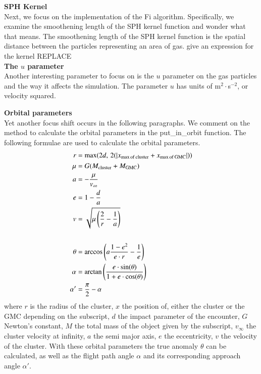 \documentclass{aa}
\begin{document}
\noindent \textbf{SPH Kernel} \\
Next, we focus on the implementation of the Fi algorithm. Specifically, we examine the smoothening length of the SPH kernel function and wonder what that means. The smoothening length of the SPH kernel function is the spatial distance between the particles representing an area of gas. \cite{1985A&A...149..135M} give an expression for the kernel REPLACE \\

\noindent \textbf{The $u$ parameter} \\
Another interesting parameter to focus on is the $u$ parameter on the gas particles and the way it affects the simulation. The parameter $u$ has units of m$^2\cdot$s$^{-2}$, or velocity squared.

\noindent \textbf{Orbital parameters} \\
Yet another focus shift occurs in the following paragraphs. We comment on the method to calculate the orbital parameters in the put\_in\_orbit function. The following formulae are used to calculate the orbital parameters.
\begin{align}
    r &= \text{max}(2d, \, 2 (\left| x_{\rm max \, of \, cluster} + x_{\rm max \, of \, GMC}\right|)) \\
    \mu &= G (M_{\rm cluster} + M_{\rm GMC}) \\
    a &= -\frac{\mu}{v_\infty} \label{eq:a} \\
    e &= 1 - \frac{d}{a} \label{eq:e} \\
    v &= \sqrt{\mu \left(\frac{2}{r} - \frac{1}{a}\right)} \\
    \newline \nonumber \\
    \theta &= \arccos \left(a \frac{1-e^2}{e\cdot r} - \frac{1}{e} \right) \\
    \alpha &=  \arctan \left(\frac{e\cdot \sin(\theta)}{1 + e\cdot \cos(\theta)}\right) \\
    \alpha' &= \frac{\pi}{2} - \alpha
\end{align}
where $r$ is the radius of the cluster, $x$ the position of, either the cluster or the GMC depending on the subscript, $d$ the impact parameter of the encounter, $G$ Newton's constant, $M$ the total mass of the object given by the subscript, $v_\infty$ the cluster velocity at infinity, $a$ the semi major axis, $e$ the eccentricity, $v$ the velocity of the cluster. With these orbital parameters the true anomaly $\theta$ can be calculated, as well as the flight path angle $\alpha$ and its corresponding approach angle $\alpha'$.
\end{document}
